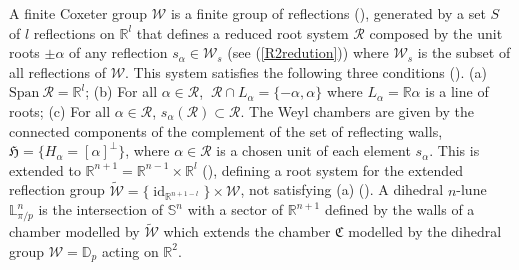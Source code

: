 \documentclass[11pt,a4paper,times]{amsart}
\theoremstyle{plain}
\theoremstyle{definition}
\numberwithin{equation}{section}
\DeclareMathOperator\id{id}
\newcommand{\R}{\mathbb{R}}
\newcommand{\D}{\mathbb{D}}
\newcommand{\lune}[2]{\mathbb{L}^{#1}_{#2}}
\begin{document}
{{A finite Coxeter group $\mathcal{W}$ is a finite group of reflections (\cite{H})},  generated by a set $S$ of $l$ reflections on $\mathbb{R}^{l}$ that defines a reduced root system
$\mathcal{R}$ composed by the unit roots $\pm \alpha$ %
 of any reflection $s_{\alpha}\in\mathcal{W}_s$ (see (\ref{R2redution})) where $\mathcal{W}_s$ is the subset  of all reflections of $\mathcal{W}$. This system   satisfies the following three conditions  (\cite[p.6-7]{H}). (a) $\mathrm{Span}~ \mathcal{R}=\mathbb{R}^l$; (b) For all $\alpha \in \mathcal{R}$, $~\mathcal{R}\cap L_{\alpha}=\{-\alpha,\alpha\}$ where $L_{\alpha}=\mathbb{R}\alpha$ is a line of roots; (c) For all $\alpha\in \mathcal{R}$, $s_{\alpha}(\mathcal{R})\subset \mathcal{R}$. 
The Weyl chambers are  given by  the connected components of the complement of the set of reflecting walls,  $\mathfrak{H}=\{H_{\alpha}=[\alpha]^{\bot}\}$, where $\alpha\in \mathcal{R}$ is a chosen unit of each element $s_{\alpha}$. This is extended to $\mathbb{R}^{n+1}=\R^{n-1}\times \R^l$ (\cite{bb}), defining a  root system for the extended reflection group $\tilde{\mathcal{W}}=\{\id_{\mathbb{R}^{n+1-l}}\}\times \mathcal{W}$, not satisfying (a) (\cite[p.\ 7]{H}). A dihedral  $n$-lune $\lune{n}{\pi/p}$ is the intersection of  $\mathbb{S}^n$ with a sector of $\R^{n+1}$ defined by the walls of a chamber modelled by  $\tilde{\mathcal{W}}$ which extends the chamber $\mathfrak{C}$ modelled by the  dihedral group $\mathcal{W}=\D_p$  acting on $\R^2$.
 
}
\end{document}

